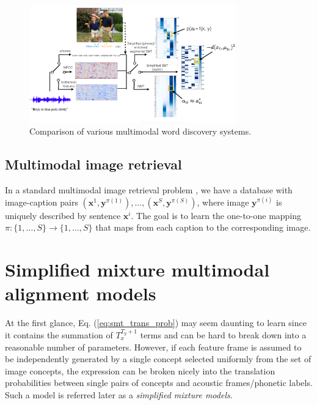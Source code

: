 \documentclass[journal]{IEEEtran}
\begin{document}
\begin{figure}[t]
    \centering
    \includegraphics[width=0.8\textwidth]{fig_1.png}
    \caption{Comparison of various multimodal word discovery systems.}
    \label{fig:model_comparison}
\end{figure}

\subsection{Multimodal image retrieval}
In a standard multimodal image retrieval problem \cite{Karpathy14}, we have a database with image-caption pairs $(\mathbf x^1, \mathbf y^{\pi(1)}), \ldots, (\mathbf x^S, \mathbf y^{\pi(S)})$, where image $\mathbf y^{\pi(i)}$ is uniquely described by sentence $\mathbf x^i$. The goal is to learn the one-to-one mapping $\pi: \{1, \ldots, S\} \rightarrow \{1, \ldots, S\}$ that maps from each caption to the corresponding image. 

\section{Simplified mixture multimodal alignment models}
At the first glance, Eq. (\ref{eq:smt_trans_prob}) may seem daunting to learn since it contains the summation of $T_x^{T_y+1}$ terms and can be hard to break down into a reasonable number of parameters. However, if each feature frame is assumed to be independently generated by a single concept selected uniformly from the set of image concepts, the expression can be broken nicely into the translation probabilities between single pairs of concepts and acoustic frames/phonetic labels. Such a model is referred later as a \textit{simplified mixture models}.
\end{document}
